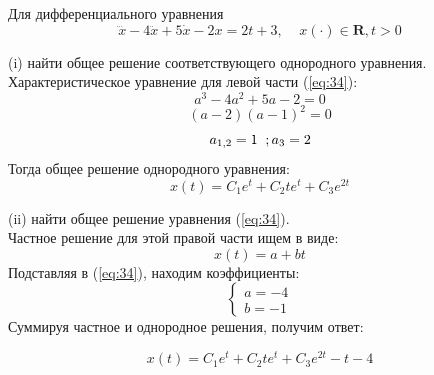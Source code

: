 \documentclass[a4paper, 12pt]{article}
\begin{document}
Для дифференциального уравнения
\begin{equation}
\dddot{x}-4\ddot{x}+5\dot{x}-2x=2t+3, \;\;\;\; x(\cdot)\in \textbf{R}, t>0
\label{eq:34}
\end{equation}

(i) найти общее решение соответствующего однородного уравнения.\\
Характеристическое уравнение для левой части (\ref{eq:34}):
\[a^3-4a^2+5a-2=0\]
\[(a-2)(a-1)^2=0\]
\[a_{1,2}=1\;\;\;\\;a_3=2\]
Тогда общее решение однородного уравнения:
\begin{equation}
x(t) = C_1e^t+C_2te^{t}+C_3e^{2t}
\label{eq:35}
\end{equation}

(ii) найти общее решение уравнения (\ref{eq:34}).\\
Частное решение для этой правой части ищем в виде:
\[ x(t) = a+bt\]
Подставляя в (\ref{eq:34}), находим коэффициенты: 
\[
\left\{
\begin{array}{lr}
a =-4\\
b = -1
\end{array}
\right.
\]
Суммируя частное и однородное решения, получим ответ:

\[x(t) = C_1e^t+C_2te^{t}+C_3e^{2t}-t-4 \]
\end{document}

